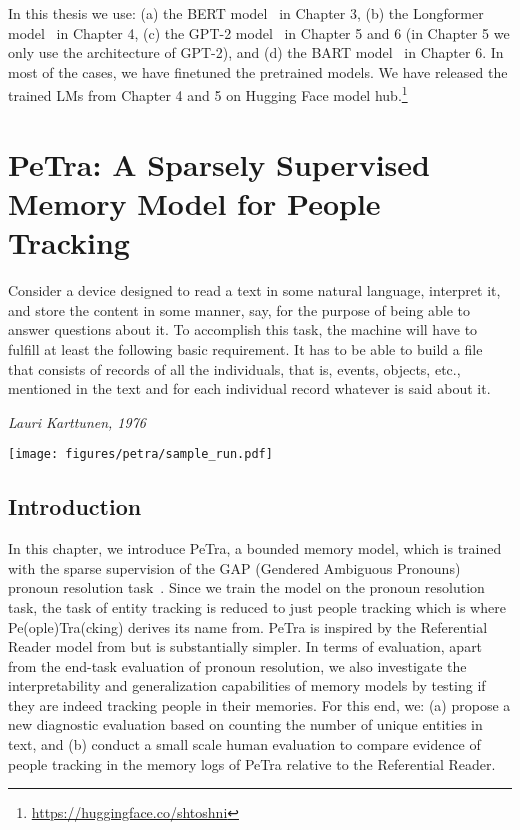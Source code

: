 \documentclass[12pt]{thesis-umich}[thesis]
\begin{document}
In this thesis we use: (a) the BERT model~\cite{devlin-etal-2019-bert} in Chapter 3, (b) the Longformer model~\cite{beltagy2020longformer} in Chapter 4, (c) the GPT-2 model~\cite{radford2019language} in Chapter 5 and 6 (in Chapter 5 we only use the architecture of GPT-2), and (d) the BART model~\cite{lewis-etal-2020-bart} in Chapter 6. In most of the cases, we have finetuned the pretrained models. We have released the trained LMs from Chapter 4 and 5 on Hugging Face model hub.\footnote{\url{https://huggingface.co/shtoshni}}          
 \chapter{PeTra: A Sparsely Supervised Memory Model for People Tracking}
\epigraph{
	\footnotesize{
		Consider a device designed to read a text in some natural language, interpret it, and store the content in some manner, say, for the purpose of being able to answer questions about it. To accomplish this task, the machine will have to fulfill at least the following basic requirement. It has to be able to build a file that consists of records of all the individuals, that is, events, objects, etc., mentioned in the text and for each individual record whatever is said about it.
}}{\textit{Lauri Karttunen, 1976}}

\begin{figure*}[ht]
    \centering
     \texttt{[image: figures/petra/sample\_run.pdf]}
     \label{fig:ideal_run}
\end{figure*}

\section{Introduction}
In this chapter, we introduce PeTra, a bounded memory model, which is trained with the sparse supervision of the GAP (Gendered Ambiguous Pronouns) pronoun resolution task~\citep{webster2018gap}. 
Since we train the model on the pronoun resolution task, the task of entity tracking is reduced to just people tracking which is where Pe(ople)Tra(cking) derives its name from. 
PeTra is inspired by the Referential Reader model from \citet{liu2019referential} but is substantially simpler. In terms of evaluation, apart from the end-task evaluation of pronoun resolution, we also investigate the interpretability and generalization capabilities of memory models by testing if they are indeed tracking people in their memories. For this end, we: (a) propose a new diagnostic evaluation based on counting the number of unique entities in text, and (b) conduct a small scale human evaluation to compare evidence of people tracking in the memory logs of PeTra relative to the Referential Reader. 
\end{document}
